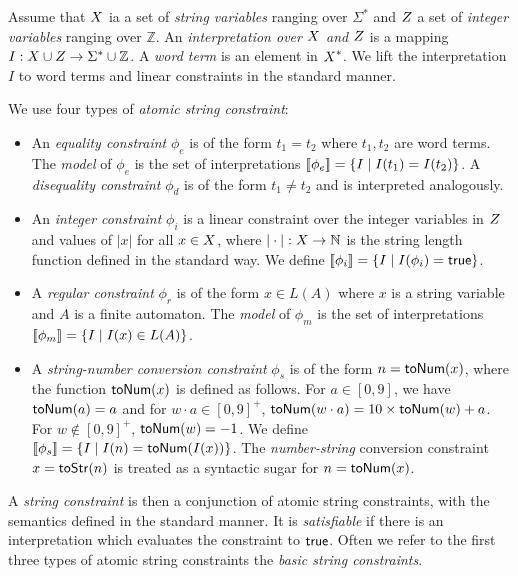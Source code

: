 \documentclass[sigplan,screen]{acmart}
\begin{document}
Assume that $\mbox{$X$}$ ia a set of \emph{string variables} ranging over $\Sigma^*$ and $\mbox{$Z$}$ a set of \emph{integer variables} ranging over $\mathbb{Z}$.
An \emph{interpretation over $\mbox{$X$}$ and $\mbox{$Z$}$} is a mapping $I:\mbox{$X$}\cup \mbox{$Z$}\rightarrow\Sigma^* \cup \mathbb{Z}$. A \emph{word term} is an element in $\mbox{$X$}^*$. We lift the interpretation $I$ to word terms and linear constraints in the standard manner. 

We  use four types of \emph{atomic string constraint}: 
\begin{itemize}

\item An \emph{equality constraint} $\phi_e$ is of the form $t_1 = t_2$ where $t_1, 
t_2$ are word terms. The \emph{model} of $\phi_e$ is the set of interpretations $[\![\phi_e]\!]=\{I\mid 
I(t_1)=I(t_2)\}$. A \emph{disequality constraint} $\phi_d$ is of the form $t_1 \neq 
t_2$ and is interpreted analogously.

\item An \emph{integer constraint} $\phi_i$ is a linear constraint over the integer variables in $\mbox{$Z$}$ and values of $|x|$ for all $x \in \mbox{$X$}$, where $|\cdot|:\mbox{$X$} \rightarrow \mathbb{N}$ is the string length function defined in the standard way.
We define $[\![\phi_i]\!]= \{I \mid I(\phi_i)= \mbox{$\mathsf{true}$} \}$. 


\item A \emph{regular constraint} $\phi_r$ is of the form $x \in L(A)$ where $x$ is a string variable and $A$ is a finite automaton. The \emph{model} of $\phi_m$ is the set of interpretations $[\![\phi_m]\!]=\{I\mid 
I(x) \in L(A) \}$. 


\item A \emph{string-number conversion constraint} $\phi_s$ is of the form $n=\mbox{\textsf{toNum}($x$)}$, where the function $\mbox{\textsf{toNum}($x$)}$ is defined as follows. For $a\in [0,9]$, we have $\mbox{\textsf{toNum}($a$)}=a$ and for $w \cdot a \in [0,9]^+$, $\mbox{\textsf{toNum}($w\cdot a$)} = 10\times \mbox{\textsf{toNum}($w$)}+a$. For $w\notin [0,9]^+$, $\mbox{\textsf{toNum}($w$)}=-1$. We define $[\![\phi_s]\!]= \{I \mid I(n)= \mbox{\textsf{toNum}($I(x)$)} \}$. The \emph{number-string} conversion constraint $x=\mbox{\textsf{toStr}($n$)}$ is treated as a syntactic sugar for $n=\mbox{\textsf{toNum}($x$)}$.

\end{itemize}

A \emph{string constraint} is then a conjunction of atomic string constraints, with the semantics defined in the standard manner. It is \emph{satisfiable} if there is an interpretation which evaluates the  constraint to $\mbox{$\mathsf{true}$}$. Often we refer to the first three types of atomic string constraints the \emph{basic string constraints}.
\end{document}
